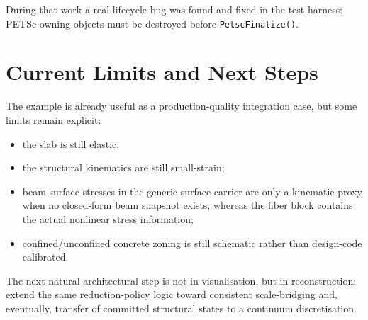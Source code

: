 During that work a real lifecycle bug was found and fixed in the test harness:
PETSc-owning objects must be destroyed before \texttt{PetscFinalize()}.

\section{Current Limits and Next Steps}

The example is already useful as a production-quality integration case, but
some limits remain explicit:
\begin{itemize}
  \item the slab is still elastic;
  \item the structural kinematics are still small-strain;
  \item beam surface stresses in the generic surface carrier are only a
        kinematic proxy when no closed-form beam snapshot exists, whereas the
        fiber block contains the actual nonlinear stress information;
  \item confined/unconfined concrete zoning is still schematic rather than
        design-code calibrated.
\end{itemize}

The next natural architectural step is not in visualisation, but in
reconstruction: extend the same reduction-policy logic toward consistent
scale-bridging and, eventually, transfer of committed structural states to a
continuum discretisation.
